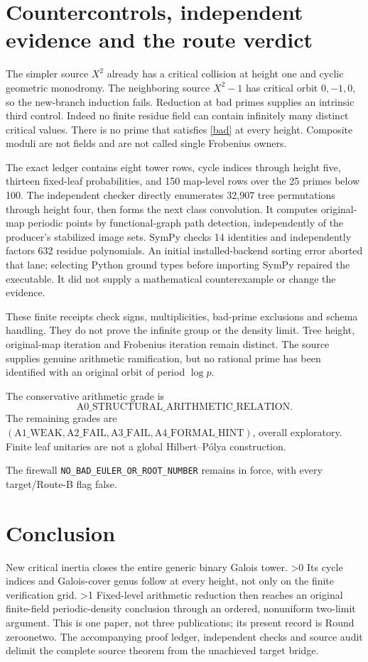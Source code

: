 \documentclass[10pt]{article}
\begin{document}
\section{Countercontrols, independent evidence and the route verdict}
The simpler source $X^2$ already has a critical collision at height one
and cyclic geometric monodromy. The neighboring source $X^2-1$ has
critical orbit $0,-1,0$, so the new-branch induction fails.
Reduction at bad primes supplies an intrinsic third control.
Indeed no finite residue field can contain infinitely many distinct
critical values. There is no prime that satisfies \eqref{bad} at every
height. Composite moduli are not fields and are not called single Frobenius owners.

The exact ledger contains eight tower rows, cycle indices through height
five, thirteen fixed-leaf probabilities, and 150 map-level rows over the
25 primes below 100. The independent checker directly enumerates 32,907
tree permutations through height four, then forms the next class convolution.
It computes original-map periodic points by functional-graph path detection,
independently of the producer's stabilized image sets.
SymPy checks 14 identities and independently factors 632 residue polynomials.
An initial installed-backend sorting error aborted that lane; selecting
Python ground types before importing SymPy repaired the executable.
It did not supply a mathematical counterexample or change the evidence.

These finite receipts check signs, multiplicities, bad-prime exclusions and
schema handling. They do not prove the infinite group or the density limit.
Tree height, original-map iteration and Frobenius iteration remain distinct.
The source supplies genuine arithmetic ramification, but no rational prime
has been identified with an original orbit of period $\log p$.

The conservative arithmetic grade is
\[
\mathrm{A0\_STRUCTURAL\_ARITHMETIC\_RELATION}.
\]
The remaining grades are
$(\mathrm{A1\_WEAK},\mathrm{A2\_FAIL},\mathrm{A3\_FAIL},
\mathrm{A4\_FORMAL\_HINT})$, overall exploratory.
Finite leaf unitaries are not a global Hilbert--Pólya construction.
\par\noindent The firewall \texttt{NO\_BAD\_EULER\_OR\_ROOT\_NUMBER} remains in force,
with every target/Route-B flag false.
\fi

\section{Conclusion}
New critical inertia closes the entire generic binary Galois tower.
\ifnum\CRevisionRound>0
Its cycle indices and Galois-cover genus follow at every height, not only
on the finite verification grid.
\fi
\ifnum\CRevisionRound>1
Fixed-level arithmetic reduction then reaches an original finite-field
periodic-density conclusion through an ordered, nonuniform two-limit argument.
\fi
This is one paper, not three publications; its present record is
Round \ifcase\CRevisionRound zero\or one\else two\fi.
The accompanying proof ledger, independent checks and source audit delimit
the complete source theorem from the unachieved target bridge.
\end{document}
